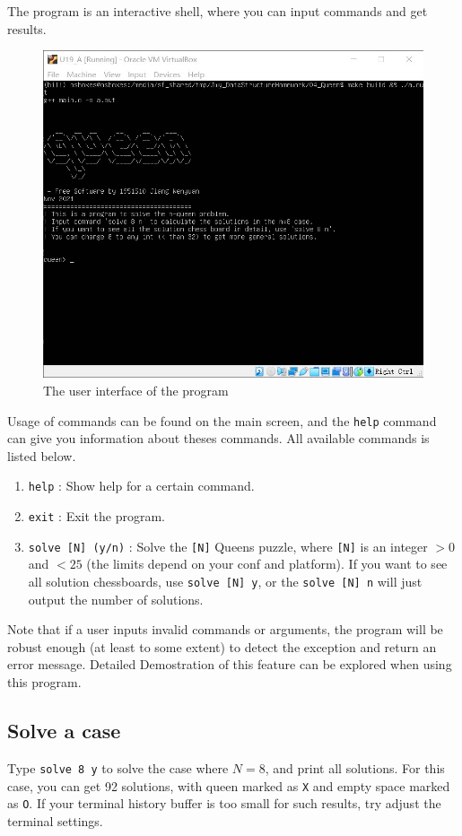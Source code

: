 \documentclass[cn,black,12pt,normal]{elegantnote}
\begin{document}
The program is an interactive shell, where you can input commands and get results.

\begin{figure}[H]
    \centering
    \includegraphics[width=0.7\linewidth]{image/queen_01.jpg}
    \caption{The user interface of the program}
\end{figure}

Usage of commands can be found on the main screen, and the \lstinline{help} command can give you information about theses commands.  All available commands is listed below.

\begin{enumerate}
    \item \lstinline{help} : Show help for a certain command.
    \item \lstinline{exit} : Exit the program.
    \item \lstinline{solve [N] (y/n)} : Solve the \lstinline{[N]} Queens puzzle, where \lstinline{[N]} is an integer $> 0$ and $< 25$ (the limits depend on your conf and platform). If you want to see all solution chessboards, use \lstinline{solve [N] y}, or the \lstinline{solve [N] n} will just output the number of solutions.
\end{enumerate}
Note that if a user inputs invalid commands or arguments, the program will be robust enough (at least to some extent) to detect the exception and return an error message. Detailed Demostration of this feature can be explored when using this program.

\subsection{Solve a case}

Type \lstinline{solve 8 y} to solve the case where $N=8$, and print all solutions. For this case, you can get 92 solutions, with queen marked as \lstinline{X} and empty space marked as \lstinline{O}. If your terminal history buffer is too small for such results, try adjust the terminal settings.
\end{document}
